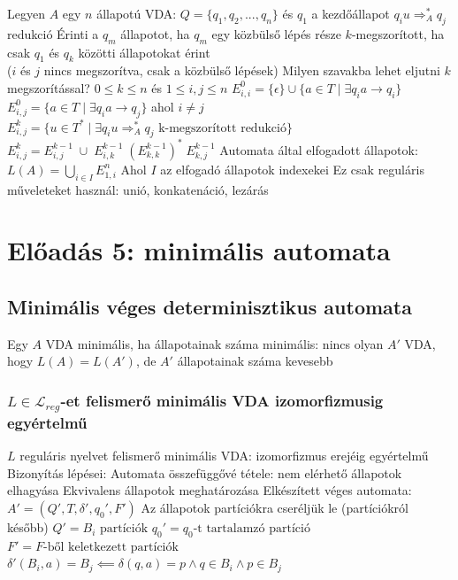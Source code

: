 \documentclass[12pt,a4paper]{article}
\newcommand{\atos}{\Rightarrow_A^*}
\begin{document}
\begin{outline}
	\1 Legyen $A$ egy $n$ állapotú VDA: $Q=\{q_1, q_2, ..., q_n\}$ és $q_1$ a kezdőállapot
	\1 $q_i u \atos q_j$ redukció
		\2 Érinti a $q_m$ állapotot, ha $q_m$ egy közbülső lépés része
		\2 $k$-megszorított, ha csak $q_1$ és $q_k$ közötti állapotokat érint\\
		($i$ és $j$ nincs megszorítva, csak a közbülső lépések)
	\1 Milyen szavakba lehet eljutni $k$ megszorítással?
		\2 $0 \le k \le n$ és $1 \le i,j \le n$
		\2 $E_{i,i}^0 = \{\epsilon\} \cup \{ a \in T \;|\; \exists q_i a \to q_i \}$
		\2 $E_{i,j}^0 = \{a \in T \;|\; \exists q_i a \to q_j \}$ ahol $i \ne j$
		\2 $E_{i,j}^k = \{u \in T^* \;|\; \exists q_i u	\atos q_j \text{ k-megszorított redukció} \}$
		\2 $E_{i,j}^k = E_{i,j}^{k-1} \; \cup \; E_{i,k}^{k-1} \; (E_{k,k}^{k-1})^* \; E_{k,j}^{k-1}$
	\1 Automata által elfogadott állapotok: $L(A) = \bigcup_{i \in I} E_{1,i}^n$
		\2 Ahol $I$ az elfogadó állapotok indexekei
		\2 Ez csak reguláris műveleteket használ: unió, konkatenáció, lezárás
\end{outline}

\pagebreak

\section{Előadás 5: minimális automata}

\subsection{Minimális véges determinisztikus automata}

\begin{outline}
	\1 Egy $A$ VDA minimális, ha állapotainak száma minimális: nincs olyan $A'$ VDA, hogy $L(A)=L(A')$, de $A'$ állapotainak száma kevesebb
\end{outline}

\subsubsection{$L \in \mathcal{L}_{reg}$-et felismerő minimális VDA izomorfizmusig egyértelmű}

\begin{outline}
	\1 $L$ reguláris nyelvet felismerő minimális VDA: izomorfizmus erejéig egyértelmű
	\1 Bizonyítás lépései:
		\2 Automata összefüggővé tétele: nem elérhető állapotok elhagyása
		\2 Ekvivalens állapotok meghatározása
	\1 Elkészített véges automata: $A'=(Q',T,\delta',q_0',F')$
		\2 Az állapotok partíciókra cseréljük le (partíciókról később)
		\2 $Q'=B_i \text{ partíciók}$
		\2 $q_0' = q_0 \text{-t tartalamzó partíció}$
		\2 $F'=F \text{-ből keletkezett partíciók}$
		\2 $\delta'(B_i,a) = B_j \impliedby \delta(q,a) = p \wedge q \in B_i \wedge p \in B_j$
\end{outline}
\end{document}
